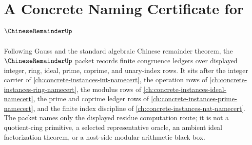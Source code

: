 \chapter{A Concrete Naming Certificate for $\ChineseRemainderUp$}
\label{ch:concrete-instances-chinese-remainder-namecert}

Following Gauss and the standard algebraic Chinese remainder theorem, the $\ChineseRemainderUp$ packet records finite congruence ledgers over displayed integer, ring, ideal, prime, coprime, and unary-index rows. It sits after the integer carrier of \autoref{ch:concrete-instances-int-namecert}, the operation rows of \autoref{ch:concrete-instances-ring-namecert}, the modulus rows of \autoref{ch:concrete-instances-ideal-namecert}, the prime and coprime ledger rows of \autoref{ch:concrete-instances-prime-namecert}, and the finite index discipline of \autoref{ch:concrete-instances-nat-namecert}. The packet names only the displayed residue computation route; it is not a quotient-ring primitive, a selected representative oracle, an ambient ideal factorization theorem, or a host-side modular arithmetic black box.

